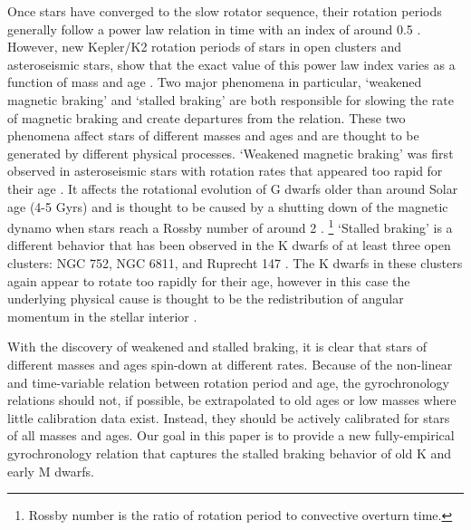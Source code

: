 Once stars have converged to the slow rotator sequence, their rotation periods
generally follow a power law relation in time with an index of around 0.5
\citep{skumanich1972}.
However, new Kepler/K2 rotation periods of stars in open clusters and
asteroseismic stars, show that the exact value of this power law index varies
as a function of mass and age \citep{angus2015, vansaders2016, curtis2019,
spada2019}.
Two major phenomena in particular, `weakened magnetic braking' and `stalled
braking' are both responsible for slowing the rate of magnetic
braking and create departures from the \citet{skumanich1972} relation.
These two phenomena affect stars of different masses and ages and are thought
to be generated by different physical processes.
`Weakened magnetic braking' was first observed in asteroseismic stars with
rotation rates that appeared too rapid for their age
\citep{angus2015}.
It affects the rotational evolution of G dwarfs older
than around Solar age (4-5 Gyrs) and is thought to be caused by a shutting down
of the magnetic dynamo when stars reach a Rossby number of around 2
\citep{vansaders2016, vansaders2018}.
\footnote{Rossby number is the ratio of rotation period to convective overturn
time.}
`Stalled braking' is a different behavior that has been observed in
the K dwarfs of at least three open clusters: NGC 752, NGC 6811, and Ruprecht
147 \citep{agueros, curtis2019, curtis2020}.
The K dwarfs in these clusters again appear to rotate too rapidly for their
age, however in this case the underlying physical cause is thought to be the
redistribution of angular momentum in the stellar interior \citep{spada2019}.

With the discovery of weakened and stalled braking, it is clear that stars of
different masses and ages spin-down at different rates.
Because of the non-linear and time-variable relation between rotation period
and age, the gyrochronology relations should not, if possible, be extrapolated
to old ages or low masses where little calibration data exist.
Instead, they should be actively calibrated for stars of all masses and ages.
Our goal in this paper is to provide a new fully-empirical gyrochronology
relation that captures the stalled braking behavior of old K and early M
dwarfs.

